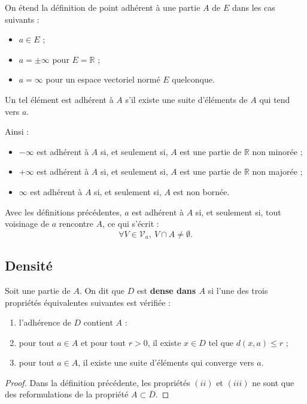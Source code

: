 \documentclass[french]{article}
\newcommand{\R}{\mathbb{R}}
\theoremstyle{plain}
\theoremstyle{definition}
\theoremstyle{remark}
\begin{document}
On étend la définition de point adhérent à une partie $A$ de $E$ dans les cas suivants :
\begin{itemize}
	\item $a\in E$ ;
	\item $a=\pm\infty$ pour $E=\R$ ;
	\item $a=\infty$ pour un espace vectoriel normé $E$ quelconque.
\end{itemize}

\begin{dfn}
	 Un tel élément est adhérent à $A$ s'il existe une suite d'éléments de $A$ qui tend vers $a$.
\end{dfn}

Ainsi :
\begin{itemize}
	\item $-\infty$ est adhérent à $A$ si, et seulement si, $A$ est une partie de $\R$ non minorée ;
	\item $+\infty$ est adhérent à $A$ si, et seulement si, $A$ est une partie de $\R$ non majorée ;
	\item $\infty$ est adhérent à $A$ si, et seulement si, $A$ est non bornée.
\end{itemize}

\begin{prop}%
	Avec les définitions précédentes, $a$ est adhérent à $A$ si, et seulement si, tout voisinage de $a$ rencontre $A$, ce qui s'écrit : 
	$$\forall V\in\mathcal{V}_a,\ V\cap A\ne\emptyset.$$
\end{prop}

\subsection{Densité}

\begin{dfn}
	Soit une partie de $A$. On dit que $D$ est \textbf{dense dans $A$} si l'une des trois propriétés équivalentes suivantes est vérifiée :
	\begin{enumerate}[label=(\roman*)]
		\item l'adhérence de $D$ contient $A$ :
		\item pour tout $a\in A$ et pour tout $r>0$, il existe $x\in D$ tel que $d(x,a)\leqslant r$ ;
		\item pour tout $a\in A$, il existe une suite d'éléments qui converge vers $a$.
	\end{enumerate}
\end{dfn}
\begin{proof}
	Dans la définition précédente, les propriétés $(ii)$ et $(iii)$ ne sont que des reformulations de la propriété $A\subset\overline{D}$.
\end{proof}
\end{document}
